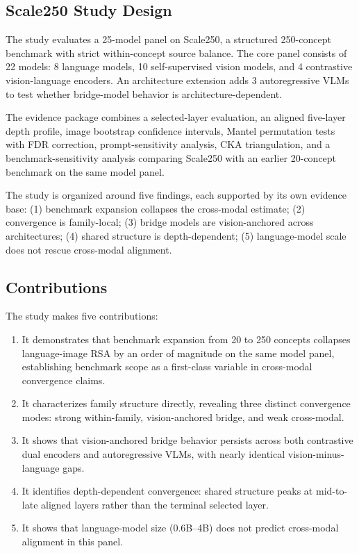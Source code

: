 \documentclass[11pt,a4paper]{article}
\providecommand{\tightlist}{%
  \setlength{\itemsep}{0pt}\setlength{\parskip}{0pt}}
\begin{document}
\subsection{Scale250 Study Design}\label{scale250-study-design}

The study evaluates a 25-model panel on Scale250, a structured
250-concept benchmark with strict within-concept source balance. The
core panel consists of 22 models: 8 language models, 10 self-supervised
vision models, and 4 contrastive vision-language encoders. An
architecture extension adds 3 autoregressive VLMs to test whether
bridge-model behavior is architecture-dependent.

The evidence package combines a selected-layer evaluation, an aligned
five-layer depth profile, image bootstrap confidence intervals, Mantel
permutation tests with FDR correction, prompt-sensitivity analysis, CKA
triangulation, and a benchmark-sensitivity analysis comparing Scale250
with an earlier 20-concept benchmark on the same model panel.

The study is organized around five findings, each supported by its own
evidence base: (1) benchmark expansion collapses the cross-modal
estimate; (2) convergence is family-local; (3) bridge models are
vision-anchored across architectures; (4) shared structure is
depth-dependent; (5) language-model scale does not rescue cross-modal
alignment.

\subsection{Contributions}\label{contributions}

The study makes five contributions:

\begin{enumerate}
\def\labelenumi{\arabic{enumi}.}
\tightlist
\item
  It demonstrates that benchmark expansion from 20 to 250 concepts
  collapses language-image RSA by an order of magnitude on the same
  model panel, establishing benchmark scope as a first-class variable in
  cross-modal convergence claims.
\item
  It characterizes family structure directly, revealing three distinct
  convergence modes: strong within-family, vision-anchored bridge, and
  weak cross-modal.
\item
  It shows that vision-anchored bridge behavior persists across both
  contrastive dual encoders and autoregressive VLMs, with nearly
  identical vision-minus-language gaps.
\item
  It identifies depth-dependent convergence: shared structure peaks at
  mid-to-late aligned layers rather than the terminal selected layer.
\item
  It shows that language-model size (0.6B--4B) does not predict
  cross-modal alignment in this panel.
\end{enumerate}
\end{document}
